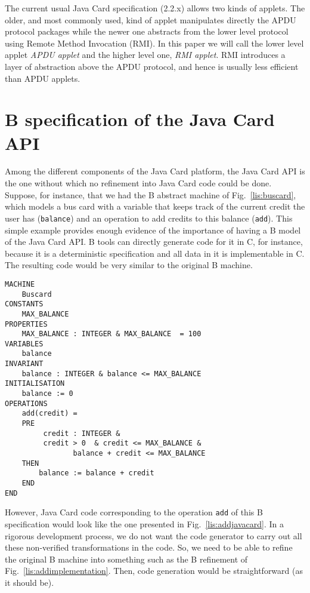 \documentclass{entcs}
\begin{document}
The current usual Java Card specification (2.2.x) allows two kinds of
applets.  The older, and most commonly used, kind of applet
manipulates directly the APDU protocol packages while the newer one
abstracts from the lower level protocol using Remote Method Invocation
(RMI). In this paper we will call the lower level applet \emph{APDU
  applet} and the higher level one, \emph{RMI applet}. RMI introduces
a layer of abstraction above the APDU protocol, and hence is usually
less efficient than APDU applets.


\section{B specification of the Java Card API}\label{sec:api-spec}

Among the different components of the Java Card platform, the Java
Card API is the one without which no refinement into Java Card code
could be done.  Suppose, for instance, that we had the B abstract
machine of Fig.~\ref{lis:buscard}, which models a bus card with a
variable that keeps track of the current credit the user has
(\texttt{balance}) and an operation to add credits to this balance
(\texttt{add}). This simple example provides enough evidence of the
importance of having a B model of the Java Card API.  B tools can directly 
generate code for it in C, for instance, because it  is a deterministic specification and all data in
it is implementable in C.  The
resulting code would be very similar to the original B machine.

\begin{lstlisting}
MACHINE
	Buscard
CONSTANTS
	MAX_BALANCE
PROPERTIES
	MAX_BALANCE : INTEGER & MAX_BALANCE  = 100
VARIABLES
	balance
INVARIANT
	balance : INTEGER & balance <= MAX_BALANCE 
INITIALISATION
	balance := 0
OPERATIONS
	add(credit) =
	PRE
		 credit : INTEGER & 
		 credit > 0  & credit <= MAX_BALANCE &
                balance + credit <= MAX_BALANCE 
	THEN
		balance := balance + credit
	END
END
\end{lstlisting}

However, Java Card code corresponding to the operation \texttt{add} of
this B specification would look like the one presented in
Fig.~\ref{lis:addjavacard}. In a rigorous development process, we do
not want the code generator to carry out all these non-verified
transformations in the code. So, we need to be able to refine the
original B machine into something such as the B refinement of
Fig.~\ref{lis:addimplementation}. Then, code generation would be
straightforward (as it should be).
\end{document}
